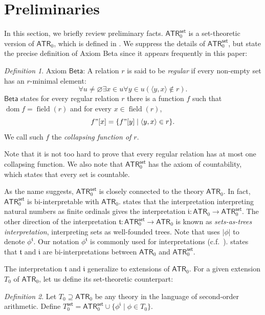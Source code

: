 \documentclass{amsart}
\theoremstyle{remark}
\newtheorem{definition}[definition]{Definition}
\newcommand{\fraki}{\mathfrak{i}}
\newcommand{\frakt}{\mathfrak{t}}
\newcommand{\Beta}{\mathsf{Beta}}
\newcommand{\ATR}{\mathsf{ATR}}
\newcommand{\set}{\mathsf{set}}
\newcommand{\dom}{\operatorname{dom}}
\newcommand{\field}{\operatorname{field}}
\begin{document}
\section{Preliminaries}\label{prelims}

In this section, we briefly review preliminary facts.
$\ATR_0^\set$ is a set-theoretic version of $\ATR_0$, which is defined in \cite[\S VII.3]{simpson2009subsystems}.
We suppress the details of $\ATR_0^\set$, but state the precise definition of Axiom Beta since it appears frequently in this paper:
\begin{definition}
    Axiom $\Beta$: A relation $r$ is said to be \emph{regular} if every non-empty set has an $r$-minimal element:
    \begin{equation*}
        \forall u\neq\varnothing \exists x\in u \forall y\in u (\langle y,x\rangle \notin r).
    \end{equation*}
    $\Beta$ states for every regular relation $r$ there is a function $f$ such that $\dom f = \field(r)$ and for every $x\in\field(r)$,
    \begin{equation*}
        f"[x] = \{f"[y]\mid \langle y,x\rangle\in r\}.
    \end{equation*}
    We call such $f$ the \emph{collapsing function of $r$}.
\end{definition}

Note that it is not too hard to prove that every regular relation has at most one collapsing function. We also note that $\ATR_0^\set$ has the axiom of countability, which states that every set is countable.

As the name suggests, $\ATR_0^\set$ is closely connected to the theory $\mathsf{ATR}_0$. In fact, $\ATR_0^\set$ is bi-interpretable with $\ATR_0$. \cite[Theorem VII.3.9]{simpson2009subsystems} states that the interpretation interpreting natural numbers as finite ordinals gives the interpretation $\fraki\colon \ATR_0\to\ATR_0^\set$.
The other direction of the interpretation $\frakt\colon \ATR_0^\set\to \ATR_0$ is known as \emph{sets-as-trees interpretation}, interpreting sets as well-founded trees.
Note that \cite{simpson2009subsystems} uses $|\phi|$ to denote $\phi^\frakt$. Our notation $\phi^\frakt$ is commonly used for interpretations (c.f.\ \cite{enderton2001mathematical}).
\cite[Theorem VII.3.29]{simpson2009subsystems} states that $\frakt$ and $\fraki$ are bi-interpretations between $\ATR_0$ and $\ATR_0^\set$.

The interpretation $\frakt$ and $\fraki$ generalize to extensions of $\ATR_0$. For a given extension $T_0$ of $\ATR_0$, let us define its set-theoretic counterpart:
\begin{definition}
    Let $T_0\supseteq \ATR_0$ be any theory in the language of second-order arithmetic. Define $T_0^\set = \ATR_0^\set \cup \{\phi^\fraki \mid \phi\in T_0\}$.
\end{definition}
\end{document}
